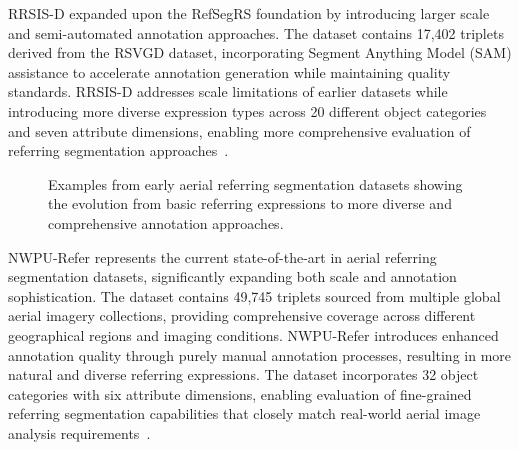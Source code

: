 RRSIS-D expanded upon the RefSegRS foundation by introducing larger scale and semi-automated annotation approaches. The dataset contains 17,402 triplets derived from the RSVGD dataset, incorporating Segment Anything Model (SAM) assistance to accelerate annotation generation while maintaining quality standards. RRSIS-D addresses scale limitations of earlier datasets while introducing more diverse expression types across 20 different object categories and seven attribute dimensions, enabling more comprehensive evaluation of referring segmentation approaches~\cite{yuan2023rrsis}.

\begin{figure}[htbp]
\centering
{}
\hfill
{}
\caption{Examples from early aerial referring segmentation datasets showing the evolution from basic referring expressions to more diverse and comprehensive annotation approaches.}
\label{fig:aerial_datasets}
\end{figure}

NWPU-Refer represents the current state-of-the-art in aerial referring segmentation datasets, significantly expanding both scale and annotation sophistication. The dataset contains 49,745 triplets sourced from multiple global aerial imagery collections, providing comprehensive coverage across different geographical regions and imaging conditions. NWPU-Refer introduces enhanced annotation quality through purely manual annotation processes, resulting in more natural and diverse referring expressions. The dataset incorporates 32 object categories with six attribute dimensions, enabling evaluation of fine-grained referring segmentation capabilities that closely match real-world aerial image analysis requirements~\cite{yang2024large}.

